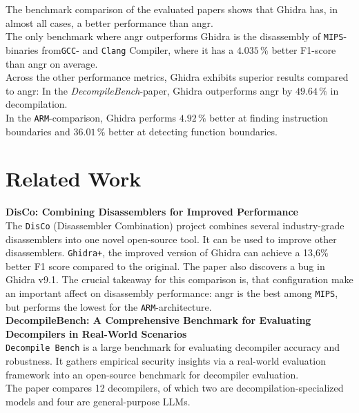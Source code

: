 \documentclass[seminar]{plai}
\begin{document}
The benchmark comparison of the evaluated papers shows that Ghidra has, in almost all cases, a better performance than angr.\\
The only benchmark where angr outperforms Ghidra is the disassembly of \texttt{MIPS}-binaries from\texttt{GCC}- and \texttt{Clang} Compiler, where it has a $4.035\,\%$ better F1-score than angr on average.\cite{DisCo-combining-disassemblers-for-improved-performance}\\
Across the other performance metrics, Ghidra exhibits superior results compared to angr: In the \textit{DecompileBench}-paper, Ghidra outperforms angr by $49.64\,\%$ in decompilation.\cite{decompileBench-comprehensice-benchmark-for-evaluating-decompilers-in-real-world-scenarios}\\
In the \texttt{ARM}-comparison, Ghidra performs $4.92\,\%$ better at finding instruction boundaries and $36.01\,\%$ better at detecting function boundaries.\cite{an-empirical-study-on-ARM-disassembly-disassembly-tools}

\section{Related Work}
\label{sec:related-work}
\textbf{DisCo: Combining Disassemblers for Improved Performance}\\
The \texttt{DisCo} (Disassembler Combination) project combines several industry-grade disassemblers into one novel open-source tool. It can be used to improve other disassemblers. \texttt{Ghidra+}, the improved version of Ghidra can achieve a 13,6\% better F1 score compared to the original. The paper also discovers a bug in Ghidra v9.1. The crucial takeaway for this comparison is, that configuration make an important affect on disassembly performance: angr is the best among \texttt{MIPS}, but performs the lowest for the \texttt{ARM}-architecture.\cite{DisCo-combining-disassemblers-for-improved-performance}\\

\noindent\textbf{DecompileBench: A Comprehensive Benchmark for Evaluating Decompilers in Real-World Scenarios}\\
\texttt{Decompile Bench} is a large benchmark for evaluating decompiler accuracy and robustness. It gathers empirical security insights via a real-world evaluation framework into an open-source benchmark for decompiler evaluation.\\
The paper compares 12 decompilers, of which two are decompilation-specialized models and four are general-purpose LLMs.\cite{decompileBench-comprehensice-benchmark-for-evaluating-decompilers-in-real-world-scenarios}\\
\end{document}
